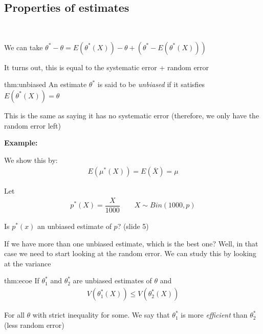 \subsection{Properties of estimates}\hfill\\\par
\noindent We can take $\theta^*-\theta = E(\theta^*(X))-\theta+(\theta^*-E(\theta^*(X)))$\par
\noindent It turns out, this is equal to the systematic error + random error
\par\bigskip
\begin{theo}{thm:unbiased}
  An estimate $\theta^*$ is said to be \textit{unbiased} if it satisfies $E(\theta^*(X)) = \theta$ 
  \par\bigskip
  \noindent This is the same as saying it has no systematic error (therefore, we only have the random error left)
\end{theo}
\par\bigskip
\noindent\textbf{Example:}\par
\noindent We show this by:
\begin{equation*}
  \begin{gathered}
    E(\mu^*(X)) = E(\overline{X}) = \mu
  \end{gathered}
\end{equation*}
\par\bigskip
\noindent Let
\begin{equation*}
  \begin{gathered}
    p^*(X) = \dfrac{X}{1000}\qquad X\sim Bin(1000,p)
  \end{gathered}
\end{equation*}\par
\noindent Is $p^*(x)$ an unbiased estimate of $p$? (slide 5)
\par\bigskip
\noindent If we have more than one unbiased estimate, which is the best one? Well, in that case we need to start looking at the random error. We can study this by looking at the variance
\par\bigskip
\begin{theo}{thm:ecoe}
  If $\theta_1^*$ and $\theta_2^*$ are unbiased estimates of $\theta$ and
  \begin{equation*}
    \begin{gathered}
      V(\theta_1^*(X))\leq V(\theta_2^*(X))
    \end{gathered}
  \end{equation*}
  \par\bigskip
  \noindent For all $\theta$ with strict inequality for some. We say that $\theta_1^*$ is more \textit{efficient} than $\theta_2^*$ (less random error)
\end{theo}
